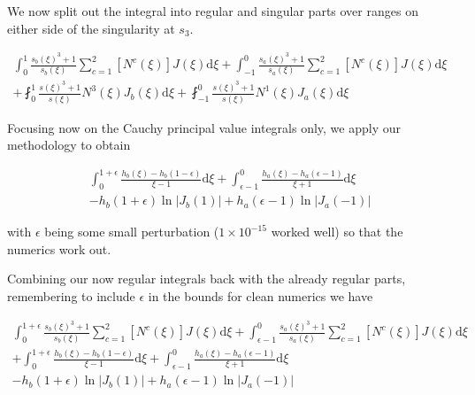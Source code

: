 We now split out the integral into regular and singular parts over ranges on either side of the singularity at $s_3$.

\begin{equation}
\begin{split}
\int_{0}^{1} \frac{s_b(\xi)^3+1}{s_b(\xi)} \sum^{2}_{c=1} \left[ N^c(\xi) \right] J(\xi) \mathrm{d}\xi
+ \int_{-1}^{0} \frac{s_a(\xi)^3+1}{s_a(\xi)} \sum^{2}_{c=1} \left[ N^c(\xi) \right] J(\xi) \mathrm{d}\xi\\
+ \fint_{0}^{1} \frac{s(\xi)^3+1}{s(\xi)} N^3(\xi) J_b(\xi) \mathrm{d}\xi
+ \fint_{-1}^{0} \frac{s(\xi)^3+1}{s(\xi)} N^1(\xi) J_a(\xi) \mathrm{d}\xi
\end{split}
\end{equation}

Focusing now on the Cauchy principal value integrals only, we apply our methodology to obtain

\begin{equation}
\begin{split}
\int_{0}^{1+\epsilon} \frac{h_b(\xi)-h_b(1-\epsilon)}{\xi-1} \mathrm{d}\xi
+ \int_{\epsilon-1}^{0} \frac{h_a(\xi)-h_a(\epsilon-1)}{\xi+1} \mathrm{d}\xi\\
- h_b(1+\epsilon) \ln \big|J_b(1)\big| + h_a(\epsilon-1) \ln \big|J_a(-1)\big|
\end{split}
\end{equation}

with $\epsilon$ being some small perturbation ($1\times 10^{-15}$ worked well) so that the numerics work out.

Combining our now regular integrals back with the already regular parts, remembering to include $\epsilon$ in the bounds for clean numerics we have

\begin{equation}
\begin{split}
\int_{0}^{1+\epsilon} \frac{s_b(\xi)^3+1}{s_b(\xi)} \sum^{2}_{c=1} \left[ N^c(\xi) \right] J(\xi) \mathrm{d}\xi
+ \int_{\epsilon-1}^{0} \frac{s_a(\xi)^3+1}{s_a(\xi)} \sum^{2}_{c=1} \left[ N^c(\xi) \right] J(\xi) \mathrm{d}\xi\\
+ \int_{0}^{1+\epsilon} \frac{h_b(\xi)-h_b(1-\epsilon)}{\xi-1} \mathrm{d}\xi
+ \int_{\epsilon-1}^{0} \frac{h_a(\xi)-h_a(\epsilon-1)}{\xi+1} \mathrm{d}\xi\\
- h_b(1+\epsilon) \ln \big|J_b(1)\big| + h_a(\epsilon-1) \ln \big|J_a(-1)\big|
\end{split}
\end{equation}

